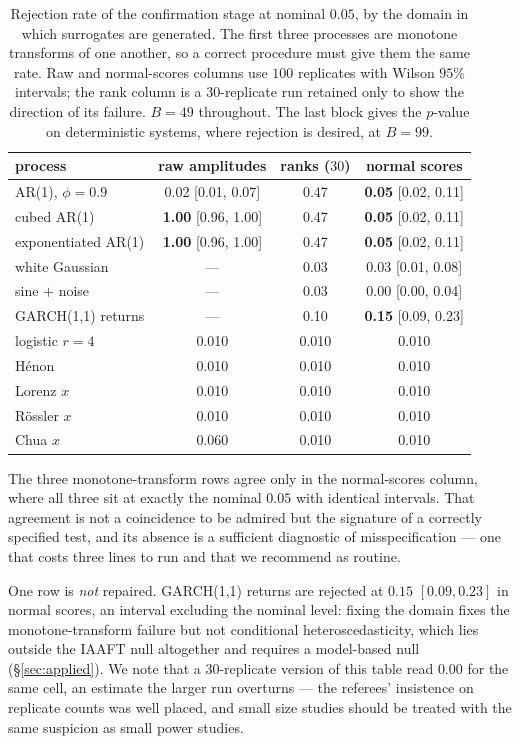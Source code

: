 \documentclass[11pt]{article}
\begin{document}
\begin{table}[h]
\centering
\caption{Rejection rate of the confirmation stage at nominal $0.05$, by the
domain in which surrogates are generated. The first three processes are monotone
transforms of one another, so a correct procedure must give them the same rate.
Raw and normal-scores columns use $100$ replicates with Wilson $95\%$ intervals;
the rank column is a $30$-replicate run retained only to show the direction of
its failure. $B=49$ throughout. The last block gives the $p$-value on
deterministic systems, where rejection is desired, at $B=99$.}
\label{tab:surr}
\begin{tabular}{lccc}
\toprule
process & raw amplitudes & ranks ($30$) & \textbf{normal scores} \\
\midrule
AR(1), $\phi=0.9$   & 0.02 [0.01, 0.07] & 0.47 & \textbf{0.05} [0.02, 0.11] \\
cubed AR(1)         & \textbf{1.00} [0.96, 1.00] & 0.47 & \textbf{0.05} [0.02, 0.11] \\
exponentiated AR(1) & \textbf{1.00} [0.96, 1.00] & 0.47 & \textbf{0.05} [0.02, 0.11] \\
white Gaussian      & --- & 0.03 & 0.03 [0.01, 0.08] \\
sine ${+}$ noise    & --- & 0.03 & 0.00 [0.00, 0.04] \\
GARCH(1,1) returns  & --- & 0.10 & \textbf{0.15} [0.09, 0.23] \\
\midrule
logistic $r=4$      & 0.010 & 0.010 & 0.010 \\
H\'enon             & 0.010 & 0.010 & 0.010 \\
Lorenz $x$          & 0.010 & 0.010 & 0.010 \\
R\"ossler $x$       & 0.010 & 0.010 & 0.010 \\
Chua $x$            & 0.060 & 0.010 & 0.010 \\
\bottomrule
\end{tabular}
\end{table}

\noindent
The three monotone-transform rows agree only in the normal-scores column, where
all three sit at exactly the nominal $0.05$ with identical intervals. That
agreement is not a coincidence to be admired but the signature of a correctly
specified test, and its absence is a sufficient diagnostic of misspecification
--- one that costs three lines to run and that we recommend as routine.

One row is \emph{not} repaired. GARCH(1,1) returns are rejected at $0.15$
$[0.09,0.23]$ in normal scores, an interval excluding the nominal level: fixing
the domain fixes the monotone-transform failure but not conditional
heteroscedasticity, which lies outside the IAAFT null altogether and requires a
model-based null (\S\ref{sec:applied}). We note that a $30$-replicate version of
this table read $0.00$ for the same cell, an estimate the larger run overturns
--- the referees' insistence on replicate counts was well placed, and small size
studies should be treated with the same suspicion as small power studies.
\end{document}
